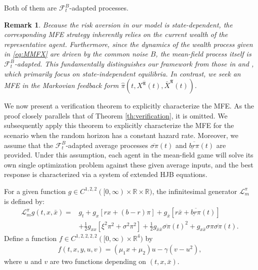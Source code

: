 \documentclass[11pt]{article}
\newtheorem{remark}{Remark}[section]
\numberwithin{equation}{section}
\newcommand{\bpi}{\boldsymbol{\pi}}
\begin{document}
 Both of them are $\mathcal{F}_t^B$-adapted processes.
\begin{remark}
Because the risk aversion in our model is state-dependent, the corresponding MFE strategy inherently relies on the current wealth of the representative agent. Furthermore, since the dynamics of the wealth process given in \eqref{eq:MMFX} are driven by the common noise $B$, the mean-field process itself is $\mathcal{F}_t^B$-adapted. This fundamentally distinguishes our framework from those in \citet{lacker2019mean} and \citet{bo2024mean}, which primarily focus on state-independent equilibria. In contrast, we seek an MFE in the Markovian feedback form $\widehat{\pi}(t, X^{\widehat{\bpi}}(t),\bar{X}^{\widehat{\bpi}}(t))$.
	\end{remark}
	
	
We now present a verification theorem to explicitly characterize the MFE. As the proof closely parallels that of Theorem \ref{th:verification}, it is omitted. We subsequently apply this theorem to explicitly characterize the MFE for the scenario when the random horizon has a constant hazard rate.
Moreover, we assume that the $\mathcal{F}_t^B$-adapted average processes $\overline{\sigma\pi}(t)$ and $\overline{\underline{br}\pi}(t)$ are provided. Under this assumption, each agent in the mean-field game will solve its own single optimization problem against these given average inputs, and the best response is characterized via a system of extended HJB equations.
	
For a given function $g \in C^{1,2,2}([0,\infty) \times \mathbb{R} \times \mathbb{R})$, the infinitesimal generator $\mathcal{L}_{\scriptscriptstyle m}^{{\pi}}$ is defined by:
	\begin{align}
		\mathcal{L}_{\scriptscriptstyle m}^{{\pi}} g(t,x,\bar{x}) = & g_t + g_x[rx + (b - r)\pi] + g_{\bar{x}}[r\bar{x} + \overline{\underline{br} \pi}(t)] \\
		& + \frac{1}{2}g_{xx}[\xi^2\pi^2 + \sigma^2 \pi^2] + \frac{1}{2}g_{\bar{x}\bar{x}}\overline{\sigma \pi}(t)^2 + g_{x\bar{x}}\sigma \pi \overline{\sigma \pi}(t).
	\end{align}
	Define a function \(f \in C^{1,2,2,2,2}([0,\infty) \times \mathbb{R}^4)\) by
	\begin{align}
		f(t, x, y, u, v) = (\mu_{1} x + \mu_{2}) u - \gamma (v - u^2),
	\end{align}
	where $u$ and $v$ are two functions depending on $(t,x,\bar{x})$.
	
\end{document}
